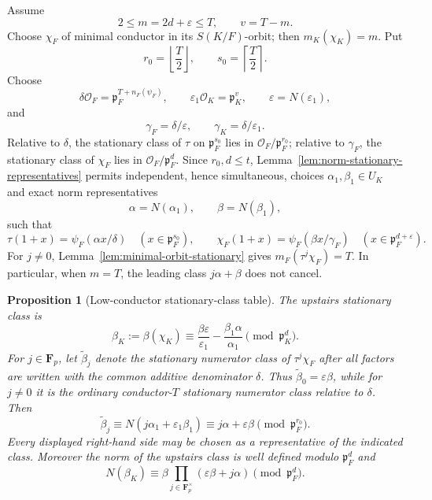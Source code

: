 \documentclass[11pt]{amsart}
\newtheorem{proposition}[theorem]{Proposition}
\theoremstyle{definition}
\theoremstyle{remark}
\newcommand{\F}{\mathbf F}
\newcommand{\cO}{\mathcal O}
\newcommand{\p}{\mathfrak p}
\begin{document}
Assume
\[
 2\le m=2d+\varepsilon\le T,
 \qquad v=T-m.
\]
Choose $\chi_F$ of minimal conductor in its $S(K/F)$-orbit; then
$m_K(\chi_K)=m$.  Put
\[
 r_0=\left\lfloor\frac T2\right\rfloor,
 \qquad s_0=\left\lceil\frac T2\right\rceil.
\]
Choose
\[
 \delta\cO_F=\p_F^{T+n_F(\psi_F)},
 \qquad \varepsilon_1\cO_K=\p_K^v,
 \qquad \varepsilon=N(\varepsilon_1),
\]
and
\begin{equation}\label{eq:gammas-low}
 \gamma_F=\delta/\varepsilon,
 \qquad \gamma_K=\delta/\varepsilon_1.
\end{equation}
Relative to $\delta$, the stationary class of $\tau$ on
$\p_F^{s_0}$ lies in $\cO_F/\p_F^{r_0}$; relative to $\gamma_F$, the
stationary class of $\chi_F$ lies in $\cO_F/\p_F^d$.  Since
$r_0,d\le t$, Lemma~\ref{lem:norm-stationary-representatives} permits
independent, hence simultaneous, choices
$\alpha_1,\beta_1\in U_K$ and exact norm representatives
\begin{equation}\label{eq:low-norm-representatives}
 \alpha=N(\alpha_1),\qquad \beta=N(\beta_1),
\end{equation}
such that
\begin{equation}\label{eq:low-mu}
 \tau(1+x)=\psi_F(\alpha x/\delta)
 \quad(x\in\p_F^{s_0}),
 \qquad
 \chi_F(1+x)=\psi_F(\beta x/\gamma_F)
 \quad(x\in\p_F^{d+\varepsilon}).
\end{equation}
For $j\ne0$, Lemma~\ref{lem:minimal-orbit-stationary} gives
$m_F(\tau^j\chi_F)=T$.  In particular, when $m=T$, the leading class
$j\alpha+\beta$ does not cancel.

\begin{proposition}[Low-conductor stationary-class table]
\label{prop:low-parameter-table}
The upstairs stationary class is
\begin{equation}\label{eq:low-beta-K}
 \beta_K:=\beta(\chi_K)
 \equiv\frac{\beta\varepsilon}{\varepsilon_1}
       -\frac{\beta_1\alpha}{\alpha_1}
 \pmod{\p_K^d}.
\end{equation}
For $j\in\F_p$, let $\widetilde\beta_j$ denote the stationary
numerator class of $\tau^j\chi_F$ after all factors are written with
the common additive denominator $\delta$.  Thus
$\widetilde\beta_0=\varepsilon\beta$, while for $j\ne0$ it is the
ordinary conductor-$T$ stationary numerator class relative to
$\delta$.  Then
\begin{equation}\label{eq:low-beta-twists}
 \widetilde\beta_j
 \equiv N(j\alpha_1+\varepsilon_1\beta_1)
 \equiv j\alpha+\varepsilon\beta
 \pmod{\p_F^{r_0}}.
\end{equation}
Every displayed right-hand side may be chosen as a representative of
the indicated class.  Moreover the norm of the upstairs class is
well defined modulo $\p_F^d$ and
\begin{equation}\label{eq:low-product-congruence}
 N(\beta_K)\equiv
 \beta\prod_{j\in\F_p^\times}(\varepsilon\beta+j\alpha)
 \pmod{\p_F^d}.
\end{equation}
\end{proposition}
\end{document}
